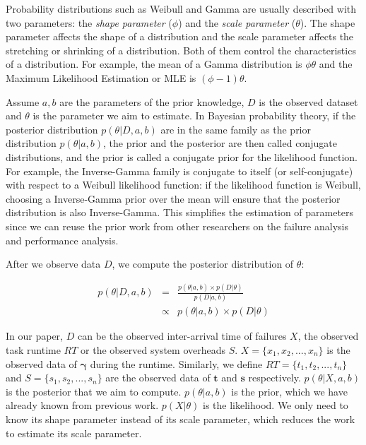 \documentclass{IOS-Book-Article}
\begin{document}
Probability distributions such as Weibull and Gamma are usually described with two parameters: the \emph{shape parameter} ($\phi$) and the \emph{scale parameter} ($\theta$). The shape parameter affects the shape of a distribution and the scale parameter affects the stretching or shrinking of a distribution. Both of them control the characteristics of a distribution. For example, the mean of a Gamma distribution is $\phi\theta$ and the Maximum Likelihood Estimation or MLE is $(\phi-1)\theta$. 

Assume $a,b$ are the parameters of the prior knowledge, $D$ is the observed dataset and $\theta$ is the parameter we aim to estimate. In Bayesian probability theory, if the posterior distribution $p(\theta|D, a, b)$ are in the same family as the prior distribution $p(\theta|a, b)$, the prior and the posterior are then called conjugate distributions, and the prior is called a conjugate prior for the likelihood function. For example, the Inverse-Gamma family is conjugate to itself (or self-conjugate) with respect to a Weibull likelihood function: if the likelihood function is Weibull, choosing a Inverse-Gamma prior over the mean will ensure that the posterior distribution is also Inverse-Gamma. This simplifies the estimation of parameters since we can reuse the prior work from other researchers \cite{Schroeder2006, Iosup2008, Sun2003, Chen2011} on the failure analysis and performance analysis. 

After we observe data $D$, we compute the posterior distribution of $\theta$:

\begin{eqnarray}
	\displaystyle  
	p(\theta|D, a, b)&=&\frac{p(\theta|a, b)\times p(D|\theta)}{p(D|a, b)}\nonumber  \\
	&\propto&p(\theta|a, b)\times p(D|\theta)\nonumber 
\end{eqnarray}

In our paper, $D$ can be the observed inter-arrival time of failures $X$, the observed task runtime $RT$ or the observed system overheads $S$. 
$X=\{x_1, x_2, ..., x_n\}$ is the observed data of $\bm\gamma$ during the runtime. Similarly, we define $RT=\{t_1, t_2, ..., t_n\}$ and $S=\{s_1, s_2, ..., s_n\}$ are the observed data of $\bm t$ and $\bm s$ respectively. $p(\theta|X,a, b)$ is the posterior that we aim to compute. $p(\theta|a, b)$ is the prior, which we have already known from previous work. $p(X|\theta)$ is the likelihood. We only need to know its shape parameter instead of its scale parameter, which reduces the work to estimate its scale parameter. 
\end{document}

